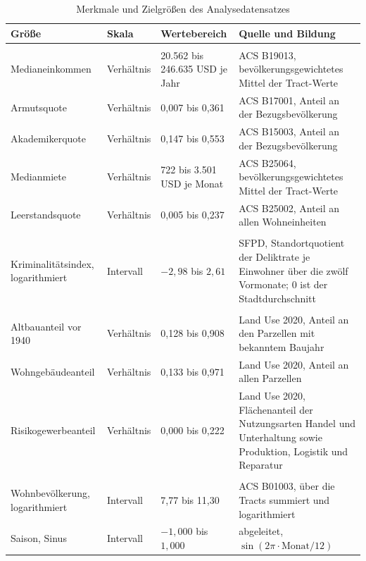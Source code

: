 \begin{table}[htbp]
\centering
\caption{Merkmale und Zielgrößen des Analysedatensatzes}
\label{tab:codebook}
\vspace{4pt}
\small
\begin{tabularx}{\textwidth}{@{}l l l X@{}}
\toprule
\textbf{Größe} & \textbf{Skala} & \textbf{Wertebereich} & \textbf{Quelle und Bildung} \\
\midrule
\addlinespace
\multicolumn{4}{@{}l}{\textbf{Merkmale --- sozioökonomisch}} \\
\addlinespace
Medianeinkommen & Verhältnis & 20.562 bis 246.635 USD je Jahr & ACS B19013, bevölkerungsgewichtetes Mittel der Tract-Werte \\
Armutsquote & Verhältnis & 0,007 bis 0,361 & ACS B17001, Anteil an der Bezugsbevölkerung \\
Akademikerquote & Verhältnis & 0,147 bis 0,553 & ACS B15003, Anteil an der Bezugsbevölkerung \\
Medianmiete & Verhältnis & 722 bis 3.501 USD je Monat & ACS B25064, bevölkerungsgewichtetes Mittel der Tract-Werte \\
Leerstandsquote & Verhältnis & 0,005 bis 0,237 & ACS B25002, Anteil an allen Wohneinheiten \\
\addlinespace
\multicolumn{4}{@{}l}{\textbf{Merkmale --- kriminalitätsbezogen}} \\
\addlinespace
Kriminalitätsindex, logarithmiert & Intervall & $-2{,}98$ bis $2{,}61$ & SFPD, Standortquotient der Deliktrate je Einwohner über die zwölf Vormonate; 0 ist der Stadtdurchschnitt \\
\addlinespace
\multicolumn{4}{@{}l}{\textbf{Merkmale --- baulich}} \\
\addlinespace
Altbauanteil vor 1940 & Verhältnis & 0,128 bis 0,908 & Land Use 2020, Anteil an den Parzellen mit bekanntem Baujahr \\
Wohngebäudeanteil & Verhältnis & 0,133 bis 0,971 & Land Use 2020, Anteil an allen Parzellen \\
Risikogewerbeanteil & Verhältnis & 0,000 bis 0,222 & Land Use 2020, Flächenanteil der Nutzungsarten Handel und Unterhaltung sowie Produktion, Logistik und Reparatur \\
\addlinespace
\multicolumn{4}{@{}l}{\textbf{Merkmale --- Größenkontrolle und Saison}} \\
\addlinespace
Wohnbevölkerung, logarithmiert & Intervall & 7,77 bis 11,30 & ACS B01003, über die Tracts summiert und logarithmiert \\
Saison, Sinus & Intervall & $-1{,}000$ bis $1{,}000$ & abgeleitet, $\sin(2\pi \cdot \text{Monat}/12)$ \\

\end{tabularx}
\end{table}
